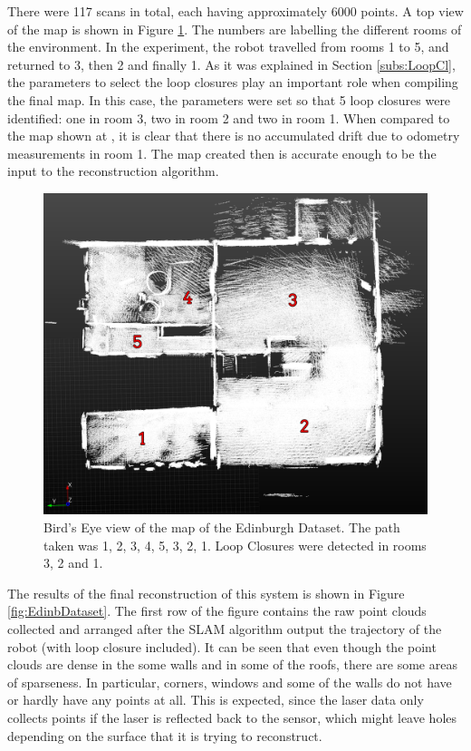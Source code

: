 \documentclass[12pt]{article}
\begin{document}
There were 117 scans in total, each having approximately 6000 points. A top view of the map is shown in Figure \ref{fig:TopViewEdinDataset}. The numbers are labelling the different rooms of the environment. In the experiment, the robot travelled from rooms 1 to 5, and returned to 3, then 2 and finally 1. As it was explained in Section \ref{subs:LoopCl}, the parameters to select the loop closures play an important role when compiling the final map. In this case, the parameters were set so that 5 loop closures were identified: one in room 3, two in room 2 and two in room 1. When compared to the map shown at \cite{AICPAlign}, it is clear that there is no accumulated drift due to odometry measurements in room 1. The map created then is accurate enough to be the input to the reconstruction algorithm.
	
\begin{figure}
\centering
\includegraphics[width=0.8\linewidth]{Maps1/TopViewMarked}
\caption{Bird's Eye view of the map of the Edinburgh Dataset. The path taken was 1, 2, 3, 4, 5, 3, 2, 1. Loop Closures were detected in rooms 3, 2 and 1.}
\label{fig:TopViewEdinDataset}
\end{figure}
	
The results of the final reconstruction of this system is shown in Figure \ref{fig:EdinbDataset}. The first row of the figure contains the raw point clouds collected and arranged after the SLAM algorithm output the trajectory of the robot (with loop closure included). It can be seen that even though the point clouds are dense in the some walls and in some of the roofs, there are some areas of sparseness. In particular, corners, windows and some of the walls do not have or hardly have any points at all. This is expected, since the laser data only collects points if the laser is reflected back to the sensor, which might leave holes depending on the surface that it is trying to reconstruct.
	
\end{document}
